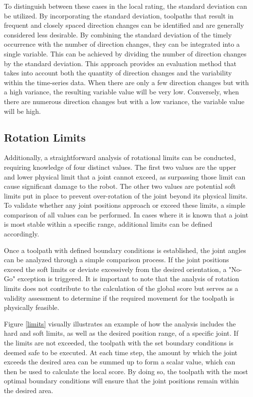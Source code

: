 \documentclass[conference]{IEEEtran}
\begin{document}
To distinguish between these cases in the local rating, the standard deviation can be utilized. By incorporating the standard deviation, toolpaths that result in frequent and closely spaced direction changes can be identified and are generally considered less desirable. By combining the standard deviation of the timely occurrence with the number of direction changes, they can be integrated into a single variable. This can be achieved by dividing the number of direction changes by the standard deviation. %
This approach provides an evaluation method that takes into account both the quantity of direction changes and the variability within the time-series data. When there are only a few direction changes but with a high variance, the resulting variable value will be very low. Conversely, when there are numerous direction changes but with a low variance, the variable value will be high.


\subsection{Rotation Limits}\label{RotLim}
Additionally, a straightforward analysis of rotational limits can be conducted, requiring knowledge of four distinct values. The first two values are the upper and lower physical limit that a joint cannot exceed, as surpassing those limit can cause significant damage to the robot. The other two values are potential soft limits put in place to prevent over-rotation of the joint beyond its physical limits. To validate whether any joint positions approach or exceed these limits, a simple comparison of all values can be performed. In cases where it is known that a joint is most stable within a specific range, additional limits can be defined accordingly.

Once a toolpath with defined boundary conditions is established, the joint angles can be analyzed through a simple comparison process. If the joint positions exceed the soft limits or deviate excessively from the desired orientation, a "No-Go" exception is triggered. It is important to note that the analysis of rotation limits does not contribute to the calculation of the global score but serves as a validity assessment to determine if the required movement for the toolpath is physically feasible.

Figure \ref{limits} visually illustrates an example of how the analysis includes the hard and soft limits, as well as the desired position range, of a specific joint. If the limits are not exceeded, the toolpath with the set boundary conditions is deemed safe to be executed. At each time step, the amount by which the joint exceeds the desired area can be summed up to form a scalar value, which can then be used to calculate the local score. By doing so, the toolpath with the most optimal boundary conditions will ensure that the joint positions remain within the desired area.
\end{document}
